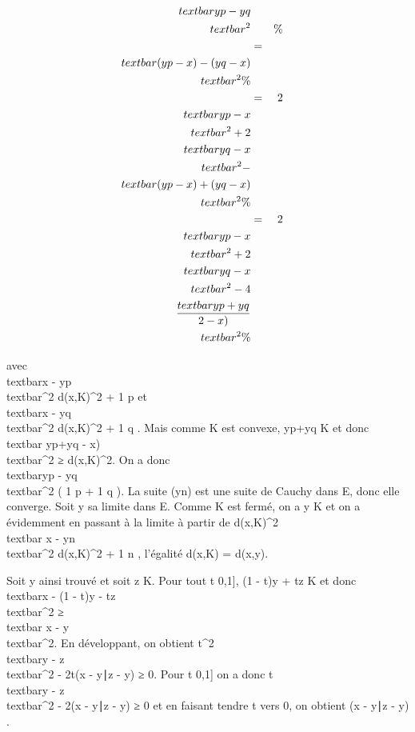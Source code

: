 \begin{align*}
\\textbar{}yp -
yq\\textbar{}^2&& \%&
\\ & =&
\\textbar{}(yp - x) - (yq -
x)\\textbar{}^2 \%&
\\ & =&
2\\textbar{}yp -
x\\textbar{}^2 +
2\\textbar{}y q -
x\\textbar{}^2 -\\textbar{}
(y p - x) + (yq -
x)\\textbar{}^2\%&
\\ & =&
2\\textbar{}yp -
x\\textbar{}^2 +
2\\textbar{}y q -
x\\textbar{}^2 - 4\\textbar{}
yp + yq \over 2 -
x)\\textbar{}^2 \%&
\\ \end{align*}

avec \\textbar{}x -
yp\\textbar{}^2 \leq
d(x,K)^2 + 1 \over p et
\\textbar{}x -
yq\\textbar{}^2 \leq
d(x,K)^2 + 1 \over q . Mais comme K est
convexe,  yp+yq  \in K et
donc \\textbar{} yp+yq
 - x)\\textbar{}^2 ≥
d(x,K)^2. On a donc \\textbar{}yp -
yq\\textbar{}^2 ( 1
\over p + 1 \over q ). La suite
(yn) est une suite de Cauchy dans E, donc elle converge. Soit
y sa limite dans E. Comme K est fermé, on a y \in K et on a évidemment en
passant à la limite à partir de d(x,K)^2
\leq\\textbar{} x -
yn\\textbar{}^2 \leq
d(x,K)^2 + 1 \over n , l'égalité d(x,K) =
d(x,y).

Soit y ainsi trouvé et soit z \in K. Pour tout t \in {[}0,1{]}, (1 - t)y +
tz \in K et donc \\textbar{}x - (1 - t)y -
tz\\textbar{}^2 ≥\\textbar{} x
- y\\textbar{}^2. En développant, on obtient
t^2\\textbar{}y -
z\\textbar{}^2 - 2t(x -
y∣z - y) ≥ 0. Pour t \in{]}0,1{]} on a donc
t\\textbar{}y - z\\textbar{}^2
- 2(x - y∣z - y) ≥ 0 et en faisant tendre t
vers 0, on obtient (x - y∣z - y) .

